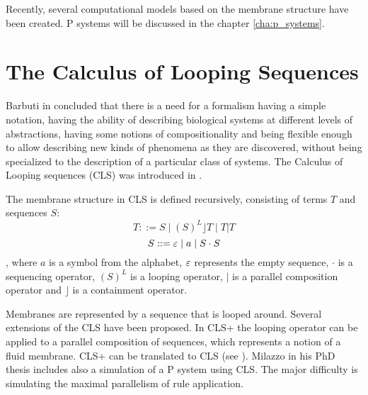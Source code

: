 Recently, several computational models based on the membrane structure have been created. P systems will be discussed in the chapter \ref{cha:p_systems}.

\section{The Calculus of Looping Sequences} %
\label{sec:calculus_of_looping_sequences}

Barbuti in \cite{Barbuti07CLS} concluded that there is a need for a formalism having a simple notation, having the ability of describing biological systems at different levels of abstractions, having some notions of compositionality and being flexible enough to allow describing new kinds of phenomena as they are discovered, without being specialized to the description of a particular class of systems. The Calculus of Looping sequences (CLS) was introduced in \cite{Barbuti07CLS}.

The membrane structure in CLS is defined recursively, consisting of terms $T$ and sequences $S$:
$$ T ::= S \mid (S)^L\rfloor T \mid T|T$$
$$ S ::= \varepsilon \mid a \mid S\cdot S $$
, where $a$ is a symbol from the alphabet, $\varepsilon$ represents the empty sequence, $\cdot$ is a sequencing operator, $(S)^L$ is a looping operator, $|$ is a parallel composition operator and $\rfloor$ is a containment operator.

Membranes are represented by a sequence that is looped around.
Several extensions of the CLS have been proposed. In CLS+ the looping operator can be applied to a parallel composition of sequences, which represents a notion of a fluid membrane.
CLS+ can be translated to CLS (see \cite{Barbuti07CLS}).
Milazzo in his PhD thesis \cite{Milazzo07CLS} includes also a simulation of a P system using CLS. The major difficulty is simulating the maximal parallelism of rule application.

